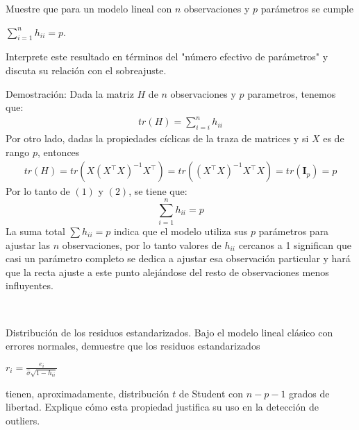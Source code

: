 \documentclass[a4paper,11pt]{article}
\begin{document}
\newpage
\begin{ejercicio}{2}
Muestre que para un modelo lineal con $n$ observaciones y $p$ parámetros se cumple

$\sum_{i=1}^{n} h_{ii} = p$.

Interprete este resultado en términos del "número efectivo de parámetros" y discuta su
relación con el sobreajuste.
\end{ejercicio}
\begin{demostracion}{Demostración:}
    Dada la matriz $H$ de $n$ observaciones y $p$ parametros, tenemos que:
    \begin{align}
        tr(H)=\sum_{i=i}^n h_{ii}
    \end{align}
    Por otro lado, dadas la propiedades cíclicas de la traza de matrices y si $X$ es de rango $p$, entonces
 \begin{align}
         tr(H)=tr(X(X^\top X)^{-1}X^\top )=tr((X^\top X)^{-1}X^\top X )=tr(\mathbf{I}_p)=p
 \end{align}
 Por lo tanto de $(1)$ y $(2)$, se tiene que:
 \[
 \sum_{i=1}^n h_{ii}=p
 \]
La suma total $\sum h_{ii} = p$ indica que el modelo utiliza  sus $p$ parámetros para ajustar las $n$ observaciones,  por lo tanto valores de $h_{ii}$ cercanos a 1 significan que casi un parámetro completo se dedica a ajustar esa observación particular y hará que la recta ajuste a este punto alejándose del resto de observaciones menos influyentes.

\
\end{demostracion}
\newpage
\begin{ejercicio}{3}
Distribución de los residuos estandarizados.
Bajo el modelo lineal clásico con errores normales, demuestre que los residuos estandarizados

$r_i = \frac{e_i}{\hat{\sigma}\sqrt{1 - h_{ii}}}$

tienen, aproximadamente, distribución $t$ de Student con $n - p - 1$ grados de libertad.
Explique cómo esta propiedad justifica su uso en la detección de outliers.
\end{ejercicio}
\end{document}
